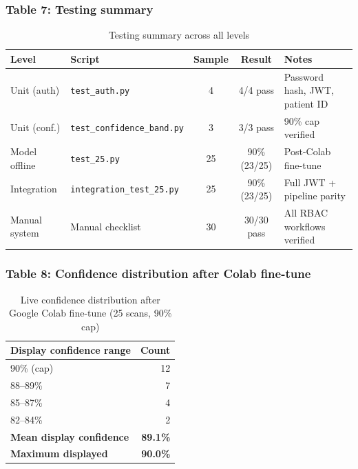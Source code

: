 \documentclass[11pt,a4paper]{article}
\begin{document}
\subsubsection{Table 7: Testing summary}
\begin{table}[H]
\centering
\caption{Testing summary across all levels}
\label{tab:testing}
\small
\begin{tabular}{|l|l|c|c|p{5.2cm}|}
\hline
\textbf{Level} & \textbf{Script} & \textbf{Sample} & \textbf{Result} & \textbf{Notes} \\
\hline
Unit (auth)      & \texttt{test\_auth.py}           & 4  & 4/4 pass       & Password hash, JWT, patient ID \\
\hline
Unit (conf.)     & \texttt{test\_confidence\_band.py} & 3  & 3/3 pass       & 90\% cap verified \\
\hline
Model offline    & \texttt{test\_25.py}             & 25 & 90\% (23/25)   & Post-Colab fine-tune \\
\hline
Integration      & \texttt{integration\_test\_25.py} & 25 & 90\% (23/25)   & Full JWT + pipeline parity \\
\hline
Manual system    & Manual checklist                 & 30 & 30/30 pass     & All RBAC workflows verified \\
\hline
\end{tabular}
\end{table}

\subsubsection{Table 8: Confidence distribution after Colab fine-tune}
\begin{table}[H]
\centering
\caption{Live confidence distribution after Google Colab fine-tune (25 scans, 90\% cap)}
\label{tab:confidence}
\small
\begin{tabular}{|l|r|}
\hline
\textbf{Display confidence range} & \textbf{Count} \\
\hline
90\% (cap)   & 12 \\
\hline
88--89\%     & 7 \\
\hline
85--87\%     & 4 \\
\hline
82--84\%     & 2 \\
\hline
\textbf{Mean display confidence} & \textbf{89.1\%} \\
\hline
\textbf{Maximum displayed}         & \textbf{90.0\%} \\
\hline
\end{tabular}
\end{table}
\end{document}
